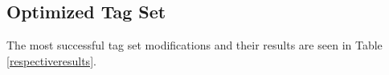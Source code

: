 \documentclass[11pt,a4paper]{article}
\begin{document}

\subsection{Optimized Tag Set}
The most successful tag set modifications and their results are seen in Table
\ref{respectiveresults}.
\end{document}
